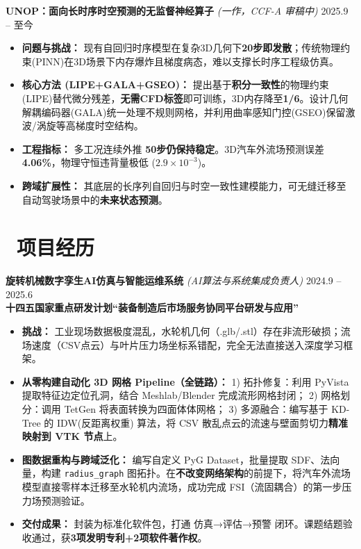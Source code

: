 \documentclass[11pt]{article}
\begin{document}
\textbf{UNOP：面向长时序时空预测的无监督神经算子} 
\textit{(一作，CCF-A 审稿中)} 
\hfill 2025.9 -- 至今
\begin{itemize}
    \item \textbf{问题与挑战：} 现有自回归时序模型在复杂3D几何下\textbf{20步即发散}；传统物理约束(PINN)在3D场景下内存爆炸且梯度病态，难以支撑长时序工程级仿真。
    \item \textbf{核心方法 (LIPE+GALA+GSEO)：} 提出基于\textbf{积分一致性}的物理约束(LIPE)替代微分残差，\textbf{无需CFD标签}即可训练，3D内存降至\textbf{1/6}。设计几何解耦编码器(GALA)统一处理不规则网格，并利用曲率感知门控(GSEO)保留激波/涡旋等高梯度时空结构。
    \item \textbf{工程指标：} 多工况连续外推 \textbf{50步仍保持稳定}。3D汽车外流场预测误差 \textbf{4.06\%}，物理守恒违背量极低 ($2.9\times10^{-3}$)。
    \item \textbf{跨域扩展性：} 其底层的长序列自回归与时空一致性建模能力，可无缝迁移至自动驾驶场景中的\textbf{未来状态预测}。
\end{itemize}


\section{\makebox[\widthof{\faBriefcase}][c]{\color{CVBlue}%
\faBriefcase}\ 项目经历}

\textbf{旋转机械数字孪生AI仿真与智能运维系统} 
\textit{(AI算法与系统集成负责人)} 
\hfill 2024.9 -- 2025.6\\[0.2em]
\textcolor{CVBlue}{\textbf{十四五国家重点研发计划``装备制造后市场服务协同平台研发与应用''}}
\begin{itemize}
    \item \textbf{挑战：} 工业现场数据极度混乱，水轮机几何（.glb/.stl）存在非流形破损；流场速度（CSV点云）与叶片压力场坐标系错配，完全无法直接送入深度学习框架。
    \item \textbf{从零构建自动化 3D 网格 Pipeline（全链路）：} 
        1) 拓扑修复：利用 PyVista 提取特征边定位孔洞，结合 Meshlab/Blender 完成流形网格封闭；
        2) 网格划分：调用 TetGen 将表面转换为四面体体网格；
        3) 多源融合：编写基于 KD-Tree 的 IDW(反距离权重) 算法，将 CSV 散乱点云的流速与壁面剪切力\textbf{精准映射到 VTK 节点}上。
    \item \textbf{图数据重构与跨域泛化：} 编写自定义 PyG Dataset，批量提取 SDF、法向量，构建 \texttt{radius\_graph} 图拓扑。在\textbf{不改变网络架构}的前提下，将汽车外流场模型直接零样本迁移至水轮机内流场，成功完成 FSI（流固耦合）的第一步压力场预测验证。
    \item \textbf{交付成果：} 封装为标准化软件包，打通 仿真→评估→预警 闭环。课题结题验收通过，获\textbf{3项发明专利+2项软件著作权}。
\end{itemize}
\end{document}
